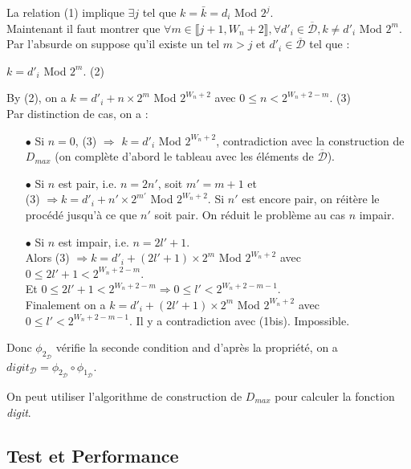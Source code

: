 \documentclass[12pt, a4paper]{memoir}
\begin{document}
\begin{Preuve}
  La relation (1) implique $\exists j$ tel que $k = \bar{k} = d_i$ Mod $2^j$. \\
  Maintenant il faut montrer que $\forall m \in \llbracket j+1,W_n+2 \rrbracket, \forall d'_i \in \overline{\mathcal{D}}, k \neq d'_i$ Mod $2^m$. \\
  Par l'absurde on suppose qu'il existe un tel $m > j$ et $d'_i \in \overline{\mathcal{D}}$ tel que :
  \begin{center} $k = d'_i$ Mod $2^m$. (2) \end{center}
  By (2), on a $k = d'_i + n \times 2^m$ Mod $2^{W_n+2}$ avec $0 \leq n < 2^{W_n+2-m}$. (3) \\
  Par distinction de cas, on a :
  \begin{itemize}
   \item[$\bullet$] Si $n = 0$, (3) $\Rightarrow$ $k = d'_i$ Mod $2^{W_n+2}$, contradiction avec la construction de $D_{max}$ (on complète d'abord le tableau avec les éléments de $\overline{\mathcal{D}}$).
   \item[$\bullet$] Si $n$ est pair, i.e. $n = 2n'$, soit $m'=m+1$ et \\
   (3) $\Rightarrow k = d'_i + n' \times 2^{m'}$ Mod $2^{W_n+2}$. Si $n'$ est encore pair, on réitère le procédé jusqu'à ce que $n'$ soit pair.
   On réduit le problème au cas $n$ impair.
   \item[$\bullet$] Si $n$ est impair, i.e. $n = 2l'+1$. \\
   Alors (3) $\Rightarrow k = d'_i + (2l'+1) \times 2^m$ Mod $2^{W_n+2}$ avec $0 \leq 2l'+1 < 2^{W_n+2-m}$. \\
   Et $0 \leq 2l'+1 < 2^{W_n+2-m} \Rightarrow 0 \leq l' < 2^{W_n+2-m-1}$. \\
   Finalement on a $k = d'_i + (2l'+1) \times 2^m$ Mod $2^{W_n+2}$ avec $0 \leq l' < 2^{W_n+2-m-1}$.
   Il y a contradiction avec (1bis). Impossible.
   \end{itemize}
  
  Donc $\phi_{2_\mathcal{D}}$ vérifie la seconde condition and d'après la propriété,
 on a $digit_{\mathcal{D}} = \phi_{2_\mathcal{D}} \circ \phi_{1_\mathcal{D}}$.
\end{Preuve}

\begin{Corollaire}
 On peut utiliser l'algorithme de construction de \emph{$D_{max}$} pour calculer la fonction \emph{digit}.
\end{Corollaire}

\subsection{Test et Performance}
\end{document}
